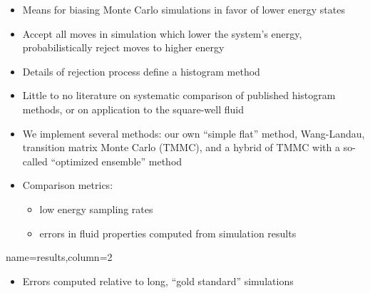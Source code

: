 \documentclass[paperwidth=48in,paperheight=36in,
fontscale=0.27,margin=0.75in]{baposter}
\begin{document}
\begin{poster}
{    \begin{itemize}
    \item Means for biasing Monte Carlo simulations in favor of lower
      energy states
    \item Accept all moves in simulation which lower the system's
      energy, probabilistically reject moves to higher energy
    \item Details of rejection process define a histogram method
    \item Little to no literature on systematic comparison of
      published histogram methods, or on application to the
      square-well fluid
    \item We implement several methods: our own ``simple flat''
      method, Wang-Landau, transition matrix Monte Carlo (TMMC), and a
      hybrid of TMMC with a so-called ``optimized ensemble'' method
    \item Comparison metrics:
      \begin{itemize}
      \item low energy sampling rates
      \item errors in fluid properties computed from simulation
        results
      \end{itemize}
    \end{itemize}

  }

  {name=results,column=2}{%

    \begin{itemize}
    \item Errors computed relative to long, ``gold standard''
      simulations
    \end{itemize}

}
\end{poster}
\end{document}
